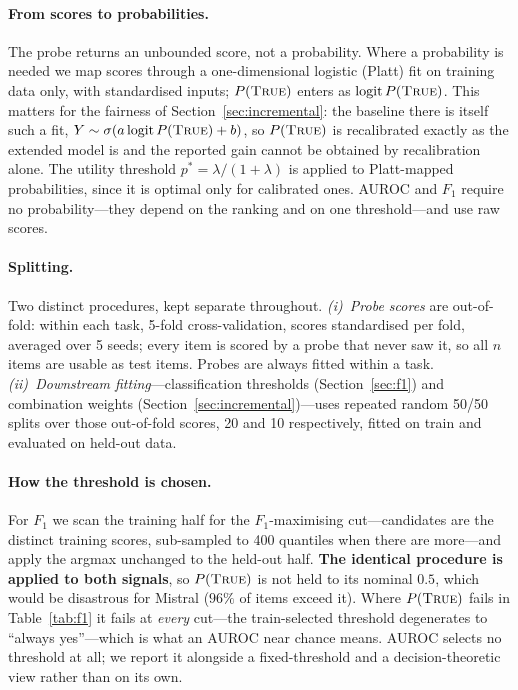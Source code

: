 \documentclass[10pt]{article}
\newcommand{\ptrue}{P(\textsc{True})}
\begin{document}
\paragraph{From scores to probabilities.} The probe returns an unbounded score, not a probability.
Where a probability is needed we map scores through a one-dimensional logistic (Platt) fit on
training data only, with standardised inputs; $\ptrue{}$ enters as $\operatorname{logit}\ptrue{}$.
This matters for the fairness of Section~\ref{sec:incremental}: the baseline there is itself such a
fit, $Y \sim \sigma(a \operatorname{logit}\ptrue{} + b)$, so $\ptrue{}$ is recalibrated exactly as
the extended model is and the reported gain cannot be obtained by recalibration alone. The utility
threshold $p^\ast = \lambda/(1{+}\lambda)$ is applied to Platt-mapped probabilities, since it is
optimal only for calibrated ones. AUROC and $F_1$ require no probability---they depend on the
ranking and on one threshold---and use raw scores.

\paragraph{Splitting.} Two distinct procedures, kept separate throughout.
\emph{(i)~Probe scores} are out-of-fold: within each task, 5-fold cross-validation, scores
standardised per fold, averaged over 5 seeds; every item is scored by a probe that never saw it, so
all $n$ items are usable as test items. Probes are always fitted within a task.
\emph{(ii)~Downstream fitting}---classification thresholds (Section~\ref{sec:f1}) and combination
weights (Section~\ref{sec:incremental})---uses repeated random 50/50 splits over those out-of-fold
scores, 20 and 10 respectively, fitted on train and evaluated on held-out data.

\paragraph{How the threshold is chosen.} For $F_1$ we scan the training half for the
$F_1$-maximising cut---candidates are the distinct training scores, sub-sampled to 400 quantiles
when there are more---and apply the argmax unchanged to the held-out half. \textbf{The identical
procedure is applied to both signals}, so $\ptrue{}$ is not held to its nominal $0.5$, which would
be disastrous for Mistral ($96\%$ of items exceed it). Where $\ptrue{}$ fails in
Table~\ref{tab:f1} it fails at \emph{every} cut---the train-selected threshold degenerates to
``always yes''---which is what an AUROC near chance means. AUROC selects no threshold at all;
we report it alongside a fixed-threshold and a decision-theoretic view rather than on its own.
\end{document}
